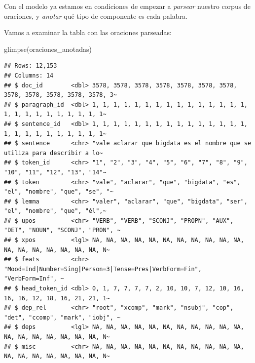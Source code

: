 \documentclass[
]{book}
\newenvironment{Shaded}{\begin{snugshade}}{\end{snugshade}}
\newcommand{\AttributeTok}[1]{\textcolor[rgb]{0.77,0.63,0.00}{#1}}
\newcommand{\CommentTok}[1]{\textcolor[rgb]{0.56,0.35,0.01}{\textit{#1}}}
\newcommand{\DecValTok}[1]{\textcolor[rgb]{0.00,0.00,0.81}{#1}}
\newcommand{\FunctionTok}[1]{\textcolor[rgb]{0.00,0.00,0.00}{#1}}
\newcommand{\NormalTok}[1]{#1}
\newcommand{\OtherTok}[1]{\textcolor[rgb]{0.56,0.35,0.01}{#1}}
\newcommand{\SpecialCharTok}[1]{\textcolor[rgb]{0.00,0.00,0.00}{#1}}
\begin{document}
Con el modelo ya estamos en condiciones de empezar a \emph{parsear} nuestro corpus de oraciones, y \emph{anotar} qué tipo de componente es cada palabra.

\begin{Shaded}
\end{Shaded}

Vamos a examinar la tabla con las oraciones parseadas:

\begin{Shaded}
\begin{Highlighting}[]
\FunctionTok{glimpse}\NormalTok{(oraciones\_anotadas)}
\end{Highlighting}
\end{Shaded}

\begin{verbatim}
## Rows: 12,153
## Columns: 14
## $ doc_id        <dbl> 3578, 3578, 3578, 3578, 3578, 3578, 3578, 3578, 3578, 3578, 3578, 3578, 3~
## $ paragraph_id  <dbl> 1, 1, 1, 1, 1, 1, 1, 1, 1, 1, 1, 1, 1, 1, 1, 1, 1, 1, 1, 1, 1, 1, 1, 1, 1~
## $ sentence_id   <dbl> 1, 1, 1, 1, 1, 1, 1, 1, 1, 1, 1, 1, 1, 1, 1, 1, 1, 1, 1, 1, 1, 1, 1, 1, 1~
## $ sentence      <chr> "vale aclarar que bigdata es el nombre que se utiliza para describir a lo~
## $ token_id      <chr> "1", "2", "3", "4", "5", "6", "7", "8", "9", "10", "11", "12", "13", "14"~
## $ token         <chr> "vale", "aclarar", "que", "bigdata", "es", "el", "nombre", "que", "se", "~
## $ lemma         <chr> "valer", "aclarar", "que", "bigdata", "ser", "el", "nombre", "que", "él",~
## $ upos          <chr> "VERB", "VERB", "SCONJ", "PROPN", "AUX", "DET", "NOUN", "SCONJ", "PRON", ~
## $ xpos          <lgl> NA, NA, NA, NA, NA, NA, NA, NA, NA, NA, NA, NA, NA, NA, NA, NA, NA, NA, N~
## $ feats         <chr> "Mood=Ind|Number=Sing|Person=3|Tense=Pres|VerbForm=Fin", "VerbForm=Inf", ~
## $ head_token_id <dbl> 0, 1, 7, 7, 7, 7, 2, 10, 10, 7, 12, 10, 16, 16, 16, 12, 18, 16, 21, 21, 1~
## $ dep_rel       <chr> "root", "xcomp", "mark", "nsubj", "cop", "det", "ccomp", "mark", "iobj", ~
## $ deps          <lgl> NA, NA, NA, NA, NA, NA, NA, NA, NA, NA, NA, NA, NA, NA, NA, NA, NA, NA, N~
## $ misc          <chr> NA, NA, NA, NA, NA, NA, NA, NA, NA, NA, NA, NA, NA, NA, NA, NA, NA, NA, N~
\end{verbatim}
\end{document}
